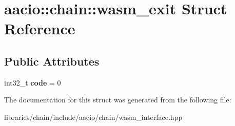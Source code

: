 \hypertarget{structaacio_1_1chain_1_1wasm__exit}{}\section{aacio\+:\+:chain\+:\+:wasm\+\_\+exit Struct Reference}
\label{structaacio_1_1chain_1_1wasm__exit}
\subsection*{Public Attributes}
\begin{DoxyCompactItemize}
\item 
\mbox{\label{structaacio_1_1chain_1_1wasm__exit_a8f84f4231a880e67cca2f6b68ed8a297}} 
int32\+\_\+t {\bfseries code} = 0
\end{DoxyCompactItemize}


The documentation for this struct was generated from the following file\+:\begin{DoxyCompactItemize}
\item 
libraries/chain/include/aacio/chain/wasm\+\_\+interface.\+hpp\end{DoxyCompactItemize}
